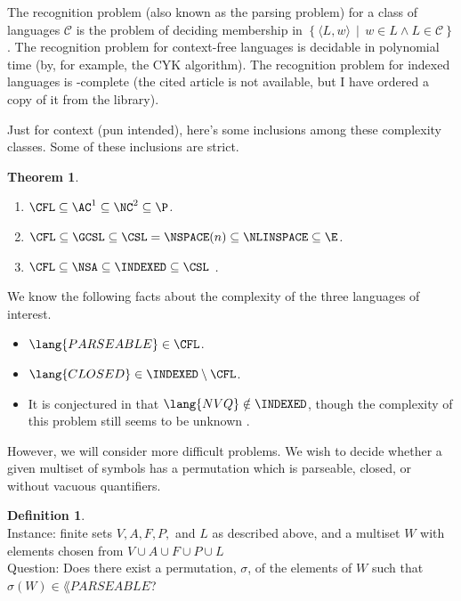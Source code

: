 \documentclass[draft]{article}
\newtheorem{theorem}{Theorem}
\theoremstyle{remark} \newtheorem{technicality}{Technical note}
\theoremstyle{definition} \newtheorem{definition}{Definition}
\newcommand{\pair}[2]{\langle#1,#2\rangle} %
\newcommand{\lb}{\left\{} %
\newcommand{\rb}{\right\}} %
\newcommand{\st}{\,\middle|\,} %
\newenvironment{langdef}[1]{\begin{definition}{\lang{#1}}}{\end{definition}}
\newenvironment{instance}{\\Instance:}{}
\newenvironment{question}{\\Question:}{}
\newcommand{\pp}{PERM\mbox{-}PARSEABLE}
\begin{document}
The recognition problem (also known as the parsing problem) for a class of languages $\mathcal{C}$ is the problem of deciding membership in $\lb\pair{L}{w}\st w\in L \land L\in\mathcal{C} \rb$.
The recognition problem for context-free languages is decidable in polynomial time (by, for example, the CYK algorithm).
The recognition problem for indexed languages is \EXP-complete \cite{tk86} (the cited article is not available, but I have ordered a copy of it from the library).

Just for context (pun intended), here's some inclusions among these complexity classes.
Some of these inclusions are strict.
\begin{theorem}\mbox{}
  \begin{enumerate}
  \item $\CFL\subseteq\AC^1\subseteq\NC^2\subseteq\P$.
  \item $\CFL\subseteq\GCSL\subseteq\CSL=\NSPACE(n)\subseteq\NLINSPACE\subseteq\E$.
  \item $\CFL\subseteq\NSA\subseteq\INDEXED\subseteq\CSL$ \cite{hu79}.
  \end{enumerate}
\end{theorem}

We know the following facts about the complexity of the three languages of interest.
\begin{itemize}
\item $\lang{PARSEABLE}\in\CFL$.
\item $\lang{CLOSED}\in\INDEXED\setminus\CFL$. \cite{mp84}
\item It is conjectured in \cite{mp84} that $\lang{NVQ}\notin\INDEXED$, though the complexity of this problem still seems to be unknown \cite{potts}.
\end{itemize}
However, we will consider more difficult problems.
We wish to decide whether a given multiset of symbols has a permutation which is parseable, closed, or without vacuous quantifiers.

\begin{langdef}{\pp}
  \begin{instance}
    finite sets $V, A, F, P,$ and $L$ as described above, and a multiset $W$ with elements chosen from $V\cup A\cup F\cup P\cup L$
  \end{instance}
  \begin{question}
    Does there exist a permutation, $\sigma$, of the elements of $W$ such that $\sigma(W)\in\lang{PARSEABLE}$?
  \end{question}
\end{langdef}
\end{document}
